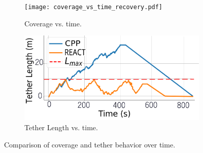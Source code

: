\begin{figure}[t]
    \centering
    \begin{subfigure}[b]{0.48\linewidth}
        \centering
        \texttt{[image: coverage\_vs\_time\_recovery.pdf]}
        \caption{Coverage vs. time.}
        \label{fig:coverage_vs_time}
    \end{subfigure}
    \hfill
    \begin{subfigure}[b]{0.48\linewidth}
        \centering
        \includegraphics[width=\linewidth]{EA-Planner/figures/tether_length_vs_time_with_recovery.pdf}
        \caption{Tether Length vs. time.}
        \label{fig:tether_vs_time}
    \end{subfigure}
    \caption{Comparison of coverage and tether behavior over time.}
    \label{fig:coverage_tether_sidebyside}
\end{figure}

